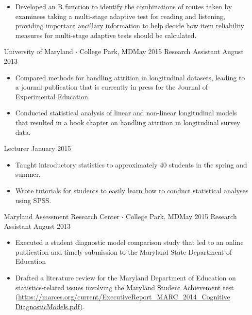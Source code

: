 \begin{experiences}
{\begin{itemize}
           \item Developed an R function to identify the combinations of routes taken by examinees taking a multi-stage adaptive test for reading and listening, providing important ancillary information to help decide how item reliability measures for multi-stage adaptive tests should be calculated.

      \end{itemize}
                    }

   \emptySeparator
   
 \experience
    {University of Maryland $\cdot$ College Park, MD}{May 2015}
    {Research Assistant}
    {August 2013}    {
       \begin{itemize}
             \item Compared methods for handling attrition in longitudinal datasets, leading to a journal publication that is currently in press for the Journal of Experimental Education.   
             
             \item Conducted statistical analysis of linear and non-linear longitudinal models that resulted in a book chapter on handling attrition in longitudinal survey data.       
       \end{itemize}
                    }
  \emptySeparator  
  
  {Lecturer}
  {January 2015}{
       \begin{itemize}
             \item Taught introductory statistics to approximately 40 students in the spring and summer.
             \item Wrote tutorials for students to easily learn how to conduct statistical analyses using SPSS.
      \end{itemize}
  }
\emptySeparator 
 \experience
    {Maryland Assessment Research Center $\cdot$ College Park, MD}{May 2015}
    {Research Assistant}
    {August 2013}    {
       \begin{itemize}
             \item Executed a student diagnostic model comparison study that led to an online publication and timely submission to the Maryland State Department of Education %
             \item Drafted a literature review for the Maryland Department of Education on statistics-related issues involving the Maryland Student Achievement test (\url{https://marces.org/current/ExecutiveReport\_MARC\_2014\_Cognitive DiagnosticModels.pdf}).
       \end{itemize}
                    }


\end{experiences}
